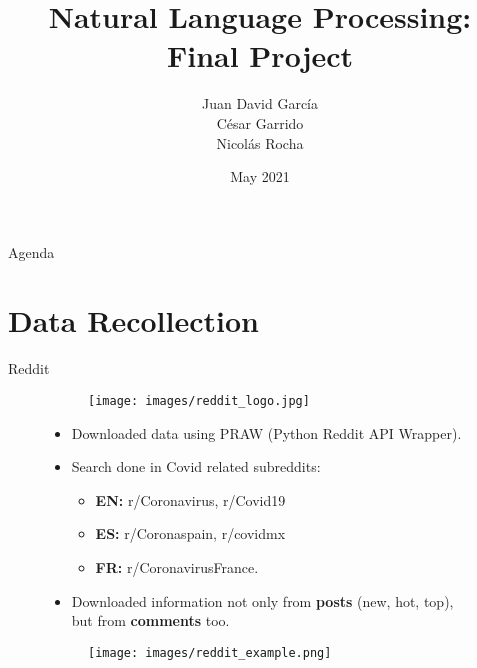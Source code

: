 \documentclass[aspectratio=169]{beamer}
\title{Natural Language Processing: Final Project}
\author{Juan David García\\
César Garrido\\
Nicolás Rocha}
\date{May 2021}
\begin{document}
\begin{frame}
    \maketitle
\end{frame}

\begin{frame}{Agenda}
    \tableofcontents
\end{frame}


\section{Data Recollection}

\begin{frame}{Reddit}

\begin{figure}[H]
    
    \begin{figure}
    \centering
    \texttt{[image: images/reddit\_logo.jpg]}
\end{figure}

\begin{itemize}
    \item Downloaded data using PRAW (Python Reddit API Wrapper).
    
    \item Search done in Covid related subreddits:
    \begin{itemize}
        \item \textbf{EN:} r/Coronavirus, r/Covid19
        
        \item \textbf{ES:} r/Coronaspain, r/covidmx
        
        \item \textbf{FR:} r/CoronavirusFrance.
    \end{itemize}
    
    \item Downloaded information not only from \textbf{posts} (new, hot, top), but from \textbf{comments} too.

\end{itemize}

    
    \endminipage\hfill
    
    \begin{figure}
        \centering
        \texttt{[image: images/reddit\_example.png]}
    \end{figure}
    
    \endminipage\hfill
\end{figure}

\end{frame}
\end{document}
